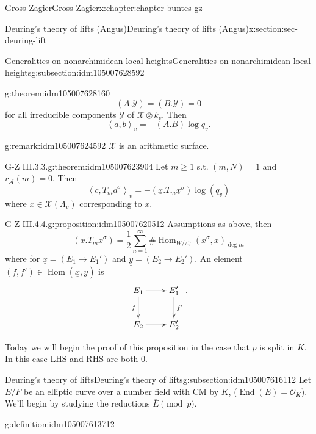 \documentclass[oneside,10pt,]{book}
\numberwithin{equation}{section}
\newcommand{\pair}[2]{\left\langle #1, #2 \right\rangle}
\newcommand{\ints}{\mathcal{O}}
\DeclareMathOperator{\End}{End}
\DeclareMathOperator{\Hom}{Hom}
\begin{document}
\begin{chapterptx}{Gross-Zagier}{}{Gross-Zagier}{}{}{x:chapter:chapter-buntes-gz}
\begin{sectionptx}{Deuring's theory of lifts (Angus)}{}{Deuring's theory of lifts (Angus)}{}{}{x:section:sec-deuring-lift}
\begin{subsectionptx}{Generalities on nonarchimidean local heights}{}{Generalities on nonarchimidean local heights}{}{}{g:subsection:idm105007628592}
\begin{theorem}{}{}{g:theorem:idm105007628160}
\begin{equation*}
(A. \mathcal Y) = (B. \mathcal Y) = 0
\end{equation*}
for all irreducible components \(\mathcal Y\) of \(\mathcal X\otimes k_v\). Then%
\begin{equation*}
\pair ab_v = -(A.B) \log q_v\text{.}
\end{equation*}
%
\end{theorem}
\begin{remark}{}{g:remark:idm105007624592}%
\(\mathcal X\) is an arithmetic surface.%
\end{remark}
\begin{theorem}{G-Z III.3.3.}{}{g:theorem:idm105007623904}%
Let \(m \ge 1\) s.t. \((m,N) = 1\) and \(r_{\mathscr A}(m)= 0\). Then%
\begin{equation*}
\pair c{T_m d^\sigma }_v = -(\underline x. T_m \underline x^\sigma ) \log(q_v)
\end{equation*}
where \(\underline x \in \mathcal X(\Lambda _v)\) corresponding to \(x\).%
\end{theorem}
\begin{proposition}{G-Z III.4.4.}{}{g:proposition:idm105007620512}%
Assumptions as  above, then%
\begin{equation*}
(\underline x. T_m \underline x^\sigma ) = \frac12 \sum_{n=1}^\infty  \#\Hom_{W/\pi _v^n}(\underline x^\sigma , \underline x)_{\deg m}
\end{equation*}
where for \(\underline x = (E_1 \to E_1')\) and \(\underline y = (E_2 \to E_2')\). An element \((f,f') \in \Hom(\underline x,\underline y) \) is%
\begin{equation*}
\xymatrix{
E_1 \ar[r] \ar[d]_{f} & E_1' \ar[d]^{f'}\\
E_2 \ar[r] & E_2'}\text{.}
\end{equation*}
%
\end{proposition}
Today we will begin the proof of this proposition in the case that \(p\) is split in \(K\). In this case LHS and RHS are both 0.%
\end{subsectionptx}
%
%
\typeout{************************************************}
\typeout{************************************************}
%
\begin{subsectionptx}{Deuring's theory of lifts}{}{Deuring's theory of lifts}{}{}{g:subsection:idm105007616112}
Let \(E/F\) be an elliptic curve over a number field with CM by \(K\), (\(\End (E) = \ints_K\)). We'll begin by studying the reductions \(\overline E \pmod p\).%
\begin{definition}{}{g:definition:idm105007613712}%

\end{definition}
\end{subsectionptx}
\end{sectionptx}
\end{chapterptx}
\end{document}
